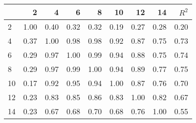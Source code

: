 \begin{tabular}{lrrrrrrrr}
\toprule
{} &     2 &     4 &     6 &     8 &    10 &    12 &    14 &  $R^2$ \\
\midrule
2  &  1.00 &  0.40 &  0.32 &  0.32 &  0.19 &  0.27 &  0.28 &   0.20 \\
4  &  0.37 &  1.00 &  0.98 &  0.98 &  0.92 &  0.87 &  0.75 &   0.73 \\
6  &  0.29 &  0.97 &  1.00 &  0.99 &  0.94 &  0.88 &  0.75 &   0.74 \\
8  &  0.29 &  0.97 &  0.99 &  1.00 &  0.94 &  0.89 &  0.77 &   0.75 \\
10 &  0.17 &  0.92 &  0.95 &  0.94 &  1.00 &  0.87 &  0.76 &   0.70 \\
12 &  0.23 &  0.83 &  0.85 &  0.86 &  0.83 &  1.00 &  0.82 &   0.67 \\
14 &  0.23 &  0.67 &  0.68 &  0.70 &  0.68 &  0.76 &  1.00 &   0.55 \\
\bottomrule
\end{tabular}
